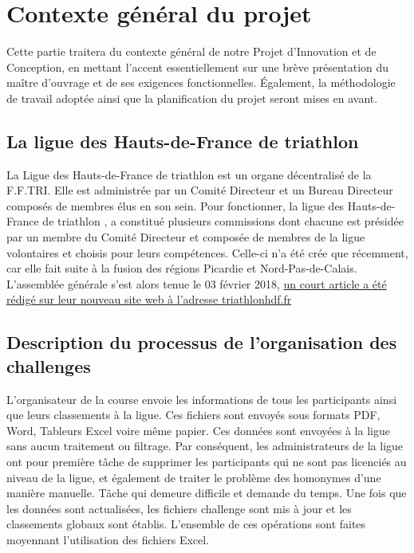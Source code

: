 \section {Contexte général du projet}
	
	Cette partie traitera du contexte général de notre Projet d’Innovation et de Conception, en mettant l’accent essentiellement sur une brève présentation du maître d'ouvrage et de ses exigences fonctionnelles. Également, la méthodologie de travail adoptée ainsi que la planification du projet seront mises en avant.  
	
	\subsection{La ligue des Hauts-de-France de triathlon }
	
	La Ligue des Hauts-de-France de triathlon est un organe décentralisé de la F.F.TRI. Elle est administrée par un Comité Directeur et un Bureau Directeur composés de membres élus en son sein. 
	Pour fonctionner, la ligue des Hauts-de-France de triathlon , a constitué plusieurs commissions dont chacune est présidée par un membre du Comité Directeur et composée de membres de la ligue volontaires et choisis pour leurs compétences.
	Celle-ci n'a été crée que récemment, car elle fait suite à la fusion des régions Picardie et Nord-Pas-de-Calais.
	L'assemblée générale s'est alors tenue le 03 février 2018, \href{http://triathlonhdf.fr/samedi-03-fevrier-2018-la-ligue-des-hauts-de-france-de-triathlon-est-creee/}{un court article a été rédigé sur leur nouveau site web à l'adresse triathlonhdf.fr} \cite{ref1}
	
	\subsection{Description du processus de l’organisation des challenges }
	L’organisateur de la course envoie les informations de tous les participants ainsi que leurs classements à la ligue. Ces fichiers sont envoyés sous formats PDF, Word, Tableurs Excel voire même papier.  Ces données sont envoyées à la ligue sans aucun traitement ou filtrage. Par conséquent, les administrateurs de la ligue ont pour première tâche de supprimer les participants qui ne sont pas licenciés au niveau de la ligue, et également de traiter le problème des homonymes d’une manière manuelle. Tâche qui demeure difficile et demande du temps.
	Une fois que les données sont actualisées, les fichiers challenge sont mis à jour et les classements globaux sont établis. L’ensemble de ces opérations sont faites moyennant l'utilisation des fichiers Excel.
	
